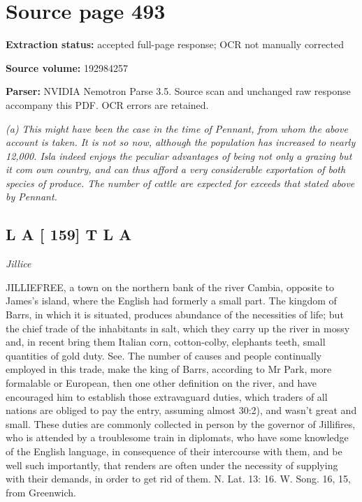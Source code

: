 \clearpage
\section{Source page 493}
\textbf{Extraction status:} accepted full-page response; OCR not manually corrected\par
\textbf{Source volume:} 192984257\par
\textbf{Parser:} NVIDIA Nemotron Parse 3.5. Source scan and unchanged raw response accompany this PDF. OCR errors are retained.\par\medskip
{\small\itshape (a) This might have been the case in the time of Pennant, from whom the above account is taken. It is not so now, although the population has increased to nearly 12,000. Isla indeed enjoys the peculiar advantages of being not only a grazing but it com own country, and can thus afford a very considerable exportation of both species of produce. The number of cattle are expected for exceeds that stated above by Pennant.\par}\medskip
\subsection*{L A [ 159] T L A}
{\small\itshape Jillice\par}\medskip
JILLIEFREE, a town on the northern bank of the river Cambia, opposite to James’s island, where the English had formerly a small part. The kingdom of Barrs, in which it is situated, produces abundance of the necessities of life; but the chief trade of the inhabitants in salt, which they carry up the river in mossy and, in recent bring them Italian corn, cotton-colby, elephants teeth, small quantities of gold duty. See. The number of causes and people continually employed in this trade, make the king of Barrs, according to Mr Park, more formalable or European, then one other definition on the river, and have encouraged him to establish those extravaguard duties, which traders of all nations are obliged to pay the entry, assuming almost 30:2), and wasn't great and small. These duties are commonly collected in person by the governor of Jillifires, who is attended by a troublesome train in diplomats, who have some knowledge of the English language, in consequence of their intercourse with them, and be well such importantly, that renders are often under the necessity of supplying with their demands, in order to get rid of them. N. Lat. 13: 16. W. Song. 16, 15, from Greenwich.\par\medskip
